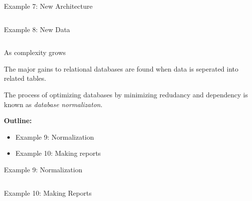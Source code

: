 \documentclass{beamer}
\begin{document}
\begin{frame}{Example 7: New Architecture }

\begin{columns}


\end{columns}

\end{frame}
\begin{frame}{Example 8: New Data }

\begin{columns}


\end{columns}

\end{frame}
\begin{frame}{As complexity grows}

\vspace{8pt}The major gains to relational databases are found when data is seperated into related tables.

\vspace{12pt}The process of optimizing databases by minimizing redudancy and dependency is known as \textit{database normalizaton}.

\vspace{12pt}
\large {\bf Outline:}
\begin{itemize}
\item Example 9: Normalization
\item Example 10: Making reports
\end{itemize}

\end{frame}
\begin{frame}{Example 9: Normalization }

\begin{columns}


\end{columns}

\end{frame}
\begin{frame}{Example 10: Making Reports }

\begin{columns}


\end{columns}

\end{frame}
\end{document}
